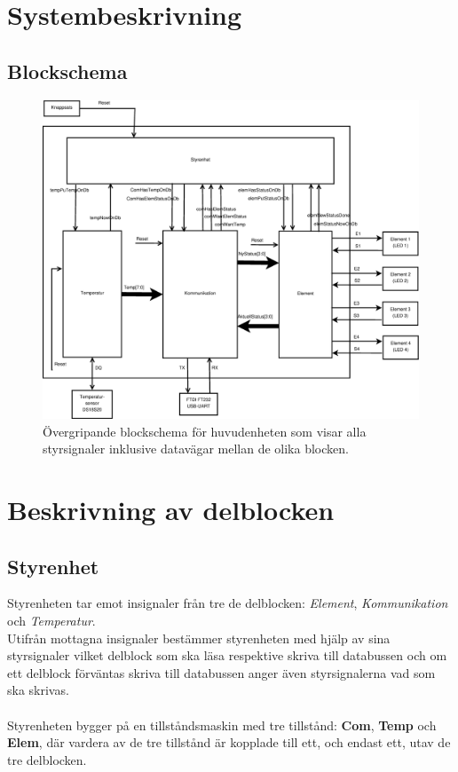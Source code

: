 \documentclass[a4paper]{scrartcl}
\begin{document}
\clearpage
\section{Systembeskrivning}

\subsection{Blockschema}
\begin{figure}[h!]
	\centering
	\advance\leftskip-3cm
	\advance\rightskip-3cm
	\includegraphics[width=15cm]{blockschema.eps}
	\caption{Övergripande blockschema för huvudenheten som visar alla styrsignaler inklusive datavägar mellan de olika blocken.}
\end{figure}


\clearpage
\section{Beskrivning av delblocken}

	\subsection{Styrenhet}
		Styrenheten tar emot insignaler från tre de delblocken: \emph{Element}, \emph{Kommunikation} och
		\emph{Temperatur}.
		\\
		Utifrån mottagna insignaler bestämmer styrenheten med hjälp av sina styrsignaler vilket delblock som ska läsa
		respektive skriva till databussen och om ett delblock förväntas skriva till databussen anger även styrsignalerna
		vad som ska skrivas.
		\\\\
		Styrenheten bygger på en tillståndsmaskin med tre tillstånd: \textbf{Com}, \textbf{Temp} och \textbf{Elem}, där vardera
		av de tre tillstånd är kopplade till ett, och endast ett, utav de tre delblocken.
\end{document}
